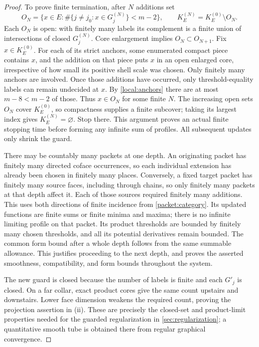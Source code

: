 \begin{proof}
To prove finite termination, after $N$ additions set
\[
 O_N=\{x\in E:\#\{j\ne j_0:x\in G_j^{(N)}\}<m-2\},
 \qquad K_E^{(N)}=K_E^{(0)}\setminus O_N.
\]
Each $O_N$ is open: with finitely many labels its complement is a
finite union of intersections of closed $G_j^{(N)}$.  Core enlargement
implies $O_N\subset O_{N+1}$.  Fix $x\in K_E^{(0)}$.  For each of its
strict anchors, some enumerated compact piece contains $x$, and the
addition on that piece puts $x$ in an open enlarged core, irrespective
of how small its positive shell scale was chosen.  Only finitely many
anchors are involved.  Once those additions have occurred, only
threshold-equality labels can remain undecided at $x$.  By
\cref{local:anchors} there are at most $m-8<m-2$ of those.
Thus $x\in O_N$ for some finite $N$.  The increasing open sets $O_N$
cover $K_E^{(0)}$, so compactness supplies a finite subcover; taking
its largest index gives $K_E^{(N)}=\varnothing$.  Stop there.
This argument proves an actual finite stopping time before forming any
infinite sum of profiles.  All subsequent updates only shrink the guard.

There may be countably many packets at one depth.  An originating packet
has finitely many directed coface occurrences, so each individual
extension has already been chosen in finitely many places.  Conversely,
a fixed target packet has finitely many source faces, including through
chains, so only finitely many packets at that depth affect it.  Each of
those sources required finitely many additions.  This uses both
directions of finite incidence from \cref{packet:category}.
Its updated functions are finite sums or finite minima and maxima;
there is no infinite limiting profile on that packet.  Its product
thresholds are bounded by finitely many chosen thresholds, and all its
potential derivatives remain bounded.  The common form bound after a
whole depth follows from the same summable allowance.  This justifies
proceeding to the next depth, and proves the asserted smoothness,
compatibility, and form bounds throughout the system.

The new guard is closed because the number of labels is finite and
each $G'_j$ is closed.  On a far collar, exact product cores give the
same count upstairs and downstairs.  Lower face dimension weakens the
required count, proving the projection assertion in (ii).  These are
precisely the closed-set and product-limit properties needed for the
guarded regularization in \cref{sec:regularization}; a quantitative
smooth tube is obtained there from regular graphical convergence.


\end{proof}
